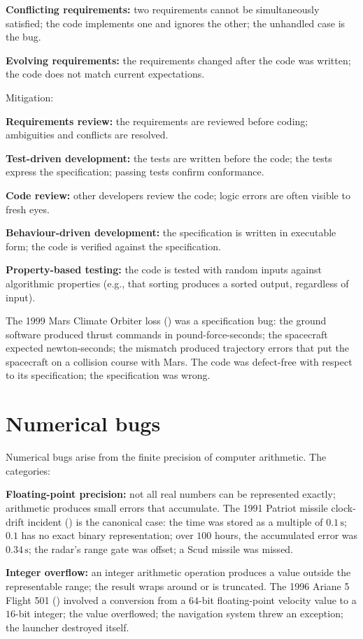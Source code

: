 \textbf{Conflicting requirements:} two requirements cannot be simultaneously satisfied; the code implements one and ignores the other; the unhandled case is the bug.

\textbf{Evolving requirements:} the requirements changed after the code was written; the code does not match current expectations.

Mitigation:

\textbf{Requirements review:} the requirements are reviewed before coding; ambiguities and conflicts are resolved.

\textbf{Test-driven development:} the tests are written before the code; the tests express the specification; passing tests confirm conformance.

\textbf{Code review:} other developers review the code; logic errors are often visible to fresh eyes.

\textbf{Behaviour-driven development:} the specification is written in executable form; the code is verified against the specification.

\textbf{Property-based testing:} the code is tested with random inputs against algorithmic properties (e.g., that sorting produces a sorted output, regardless of input).

The 1999 Mars Climate Orbiter loss (\cite{acc:nasa-mco-mib}) was a specification bug: the ground software produced thrust commands in pound-force-seconds; the spacecraft expected newton-seconds; the mismatch produced trajectory errors that put the spacecraft on a collision course with Mars. The code was defect-free with respect to its specification; the specification was wrong.

\section{Numerical bugs}

Numerical bugs arise from the finite precision of computer arithmetic. The categories:

\textbf{Floating-point precision:} not all real numbers can be represented exactly; arithmetic produces small errors that accumulate. The 1991 Patriot missile clock-drift incident (\cite{acc:gao-patriot-1992}) is the canonical case: the time was stored as a multiple of $0.1\,\text{s}$; $0.1$ has no exact binary representation; over $100$ hours, the accumulated error was $0.34\,\text{s}$; the radar's range gate was offset; a Scud missile was missed.

\textbf{Integer overflow:} an integer arithmetic operation produces a value outside the representable range; the result wraps around or is truncated. The 1996 Ariane 5 Flight 501 (\cite{acc:ariane501-ifr}) involved a conversion from a $64$-bit floating-point velocity value to a $16$-bit integer; the value overflowed; the navigation system threw an exception; the launcher destroyed itself.

